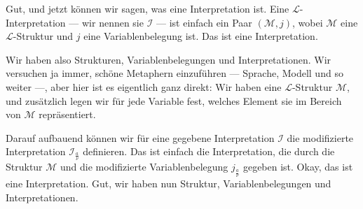 \begin{spoken-clean}[00:53:24 - 00:55:26]
Gut, und jetzt können wir sagen, was eine Interpretation ist. Eine $\mathcal{L}$-Interpretation --- wir nennen sie $\mathcal{I}$ --- ist einfach ein Paar $(\mathcal{M}, j)$, wobei $\mathcal{M}$ eine $\mathcal{L}$-Struktur und $j$ eine Variablenbelegung ist. Das ist eine Interpretation.

Wir haben also Strukturen, Variablenbelegungen und Interpretationen. Wir versuchen ja immer, schöne Metaphern einzuführen --- Sprache, Modell und so weiter ---, aber hier ist es eigentlich ganz direkt: Wir haben eine $\mathcal{L}$-Struktur $\mathcal{M}$, und zusätzlich legen wir für jede Variable fest, welches Element sie im Bereich von $\mathcal{M}$ repräsentiert.

Darauf aufbauend können wir für eine gegebene Interpretation $\mathcal{I}$ die modifizierte Interpretation $\mathcal{I}_{\frac{a}{\nu}}$ definieren. Das ist einfach die Interpretation, die durch die Struktur $\mathcal{M}$ und die modifizierte Variablenbelegung $j_{\frac{a}{\nu}}$ gegeben ist. Okay, das ist eine Interpretation. Gut, wir haben nun Struktur, Variablenbelegungen und Interpretationen.
\end{spoken-clean}

\begin{math-stroke}
\end{math-stroke}

